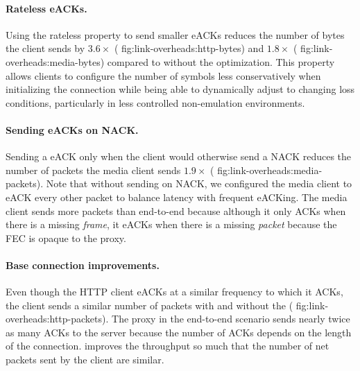 
\paragraph{Rateless eACKs.}
Using the rateless property to send smaller eACKs
reduces the number of bytes the client sends by $3.6\!\times$ (\Cref
{fig:link-overheads:http-bytes}) and $1.8\!\times$ (\Cref
{fig:link-overheads:media-bytes}) compared to \Sys without the optimization.
This property allows clients to configure the number of symbols less
conservatively when initializing the \Sys connection while being able to
dynamically adjust to changing loss conditions, particularly in less controlled
non-emulation environments.

\paragraph{Sending eACKs on NACK.}

Sending a eACK only when the client would otherwise send a NACK reduces the
number of packets the media client sends $1.9\!\times$ (\Cref
{fig:link-overheads:media-packets}). Note that without sending on NACK, we
configured the media client to eACK every other packet to balance latency with
frequent eACKing. The media client sends more packets than end-to-end because
although it only ACKs when there is a missing \textit{frame}, it eACKs when
there is a missing \textit{packet} because the FEC is opaque to the proxy.

\paragraph{Base connection improvements.}

Even though the HTTP client eACKs at a similar frequency to which it ACKs, the
client sends a similar number of packets with and without the \Sys (\Cref
{fig:link-overheads:http-packets}). The proxy in the end-to-end scenario sends
nearly twice as many ACKs to the server because the number of ACKs depends on
the length of the connection. \Sys improves the throughput so much that the
number of net packets sent by the client are similar.

